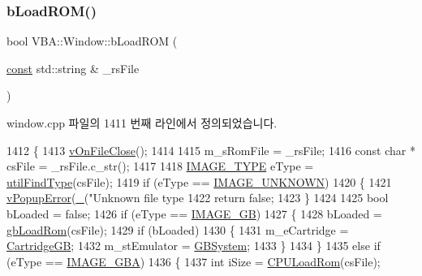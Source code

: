 \subsubsection{\texorpdfstring{b\+Load\+R\+O\+M()}{bLoadROM()}}
{\footnotesize\ttfamily bool V\+B\+A\+::\+Window\+::b\+Load\+R\+OM (\begin{DoxyParamCaption}\item[{\mbox{\hyperlink{getopt1_8c_a2c212835823e3c54a8ab6d95c652660e}{const}} std\+::string \&}]{\+\_\+rs\+File }\end{DoxyParamCaption})}



window.\+cpp 파일의 1411 번째 라인에서 정의되었습니다.


\begin{DoxyCode}
1412 \{
1413   \mbox{\hyperlink{class_v_b_a_1_1_window_a9bb969481b9cfea3b5b5bc157ccc0ff6}{vOnFileClose}}();
1414 
1415   m\_sRomFile = \_rsFile;
1416   \textcolor{keyword}{const} \textcolor{keywordtype}{char} * csFile = \_rsFile.c\_str();
1417 
1418   \mbox{\hyperlink{_util_8h_aef8b88d56fdf9a25f990a68d80c014d8}{IMAGE\_TYPE}} eType = \mbox{\hyperlink{_util_8cpp_a449eb17db1a1c0e1961fa31ec9fe9098}{utilFindType}}(csFile);
1419   \textcolor{keywordflow}{if} (eType == \mbox{\hyperlink{_util_8h_aef8b88d56fdf9a25f990a68d80c014d8ac9e52255f1b44bcb0257383d948c3153}{IMAGE\_UNKNOWN}})
1420   \{
1421     \mbox{\hyperlink{class_v_b_a_1_1_window_afde18894816458e195f561b03ee2898c}{vPopupError}}(\mbox{\hyperlink{getopt_8c_a86a239addea586602343007a370bf8ad}{\_}}(\textcolor{stringliteral}{"Unknown file type %
1422     \textcolor{keywordflow}{return} \textcolor{keyword}{false};
1423   \}
1424 
1425   \textcolor{keywordtype}{bool} bLoaded = \textcolor{keyword}{false};
1426   \textcolor{keywordflow}{if} (eType == \mbox{\hyperlink{_util_8h_aef8b88d56fdf9a25f990a68d80c014d8a72281d361ec2edaf47e3a93b136dd4ed}{IMAGE\_GB}})
1427   \{
1428     bLoaded = \mbox{\hyperlink{_g_b_8cpp_aaae8b670cb72dd026dbe85e96fc26b65}{gbLoadRom}}(csFile);
1429     \textcolor{keywordflow}{if} (bLoaded)
1430     \{
1431       m\_eCartridge = \mbox{\hyperlink{class_v_b_a_1_1_window_af580451d3ee7a738a73434858a08fa65a23a8d7e61dfcb4c1935477f7b9b80067}{CartridgeGB}};
1432       m\_stEmulator = \mbox{\hyperlink{_g_b_8cpp_a4b388379bafe0e6ea2e7b57486ffa929}{GBSystem}};
1433     \}
1434   \}
1435   \textcolor{keywordflow}{else} \textcolor{keywordflow}{if} (eType == \mbox{\hyperlink{_util_8h_aef8b88d56fdf9a25f990a68d80c014d8a25f0ac1f3a37d568346fedece32e4bfb}{IMAGE\_GBA}})
1436   \{
1437     \textcolor{keywordtype}{int} iSize = \mbox{\hyperlink{_g_b_a_8cpp_adf01776f4395b0ce9730d01a990d9082}{CPULoadRom}}(csFile);
}
\end{DoxyCode}
